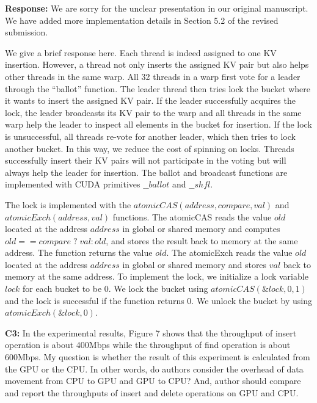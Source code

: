 \noindent\textbf{Response:} We are sorry for the unclear presentation in our original manuscript. We have added more implementation details in Section 5.2 of the revised submission. 

We give a brief response here. Each thread is indeed assigned to one KV insertion. 
However, a thread not only inserts the assigned KV pair but also helps other threads in the same warp.
All 32 threads in a warp first vote for a leader through the ``ballot'' function.
The leader thread then tries lock the bucket where it wants to insert the assigned KV pair. 
If the leader successfully acquires the lock, the leader broadcasts its KV pair to the warp and all threads in the same warp help the leader to inspect all elements in the bucket for insertion. If the lock is unsuccessful, all threads re-vote for another leader, which then tries to lock another bucket. In this way, we reduce the cost of spinning on locks. Threads successfully insert their KV pairs will not participate in the voting but will always help the leader for insertion. 
The ballot and broadcast functions are implemented with CUDA primitives $\_\_ballot$ and $\_\_shfl$.

The lock is implemented with the $atomicCAS(address,compare,val)$ and $atomicExch(address,val)$ functions. 
The atomicCAS reads the value $old$ located at the address $address$ in global or shared memory and computes $old == compare \;?\; val : old$, and stores the result back to memory at the same address.
The function returns the value $old$. 
The atomicExch reads the value $old$ located at the address $address$ in global or shared memory and stores $val$ back to memory at the same address.
To implement the lock, we initialize a lock variable $lock$ for each bucket to be $0$. 
We lock the bucket using $atomicCAS(\&lock,0,1)$ and the lock is successful if the function returns $0$. 
We unlock the bucket by using $atomicExch(\&lock,0)$. 



 

\begin{shaded}
	\noindent\textbf{C3:} In the experimental results, Figure 7 shows that the throughput of insert operation is about 400Mbps while the throughput of find operation is about 600Mbps. My question is whether the result of this experiment is calculated from the GPU or the CPU. In other words, do authors consider the overhead of data movement from CPU to GPU and GPU to CPU? And, author should compare and report the throughputs of insert and delete operations on GPU and CPU.
\end{shaded}


